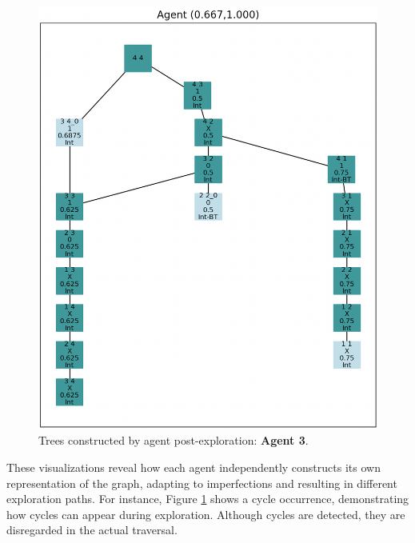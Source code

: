 \begin{figure}[H]
\centering
\includegraphics[width=1\textwidth]{Cap2/agent_3.png}
\caption{Trees constructed by agent post-exploration: \textbf{Agent 3}.}
\label{fig_agent_3_tree}
\end{figure}
    
These visualizations reveal how each agent independently constructs its own representation of the graph, adapting to imperfections and resulting in different exploration paths. For instance, Figure \ref{fig_agent_3_tree} shows a cycle occurrence, demonstrating how cycles can appear during exploration. Although cycles are detected, they are disregarded in the actual traversal.